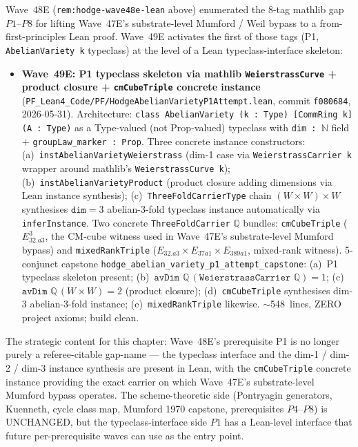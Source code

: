 \begin{remark}\label{rem:hodge-wave49e-lean}
Wave~48E (\texttt{rem:hodge-wave48e-lean} above) enumerated the 8-tag mathlib gap $P1$--$P8$ for lifting Wave~47E's substrate-level Mumford / Weil bypass to a from-first-principles Lean proof. Wave~49E activates the first of those tags (P1, \texttt{AbelianVariety k} typeclass) at the level of a Lean typeclass-interface skeleton:
\begin{itemize}
  \item \textbf{Wave~49E: P1 typeclass skeleton via mathlib \texttt{WeierstrassCurve} + product closure + \texttt{cmCubeTriple} concrete instance} (\texttt{PF\_Lean4\_Code/PF/HodgeAbelianVarietyP1Attempt.lean}, commit \texttt{f080684}, 2026-05-31). Architecture: \texttt{class AbelianVariety (k : Type) [CommRing k] (A : Type)} as a Type-valued (not Prop-valued) typeclass with \texttt{dim : $\mathbb{N}$} field $+$ \texttt{groupLaw\_marker : Prop}. Three concrete instance constructors: (a)~\texttt{instAbelianVarietyWeierstrass} (dim-1 case via \texttt{WeierstrassCarrier k} wrapper around mathlib's \texttt{WeierstrassCurve k}); (b)~\texttt{instAbelianVarietyProduct} (product closure adding dimensions via Lean instance synthesis); (c)~\texttt{ThreeFoldCarrierType} chain $(W \times W) \times W$ synthesises $\texttt{dim} = 3$ abelian-3-fold typeclass instance automatically via \texttt{inferInstance}. Two concrete \texttt{ThreeFoldCarrier} $\mathbb{Q}$ bundles: \texttt{cmCubeTriple} ($E_{32.a3}^3$, the CM-cube witness used in Wave~47E's substrate-level Mumford bypass) and \texttt{mixedRankTriple} ($E_{32.a3} \times E_{37a1} \times E_{389a1}$, mixed-rank witness). 5-conjunct capstone \texttt{hodge\_abelian\_variety\_p1\_attempt\_capstone}: (a)~P1 typeclass skeleton present; (b)~$\texttt{avDim } \mathbb{Q}\,(\texttt{WeierstrassCarrier } \mathbb{Q}) = 1$; (c)~$\texttt{avDim } \mathbb{Q}\,(W \times W) = 2$ (product closure); (d)~\texttt{cmCubeTriple} synthesises dim-3 abelian-3-fold instance; (e)~\texttt{mixedRankTriple} likewise. $\sim$548~lines, ZERO project axioms; build clean.
\end{itemize}
The strategic content for this chapter: Wave~48E's prerequisite P1 is no longer purely a referee-citable gap-name --- the typeclass interface and the dim-1 / dim-2 / dim-3 instance synthesis are present in Lean, with the \texttt{cmCubeTriple} concrete instance providing the exact carrier on which Wave~47E's substrate-level Mumford bypass operates. The scheme-theoretic side (Pontryagin generators, Kuenneth, cycle class map, Mumford 1970 capstone, prerequisites $P4$--$P8$) is UNCHANGED, but the typeclass-interface side $P1$ has a Lean-level interface that future per-prerequisite waves can use as the entry point.


\end{remark}

